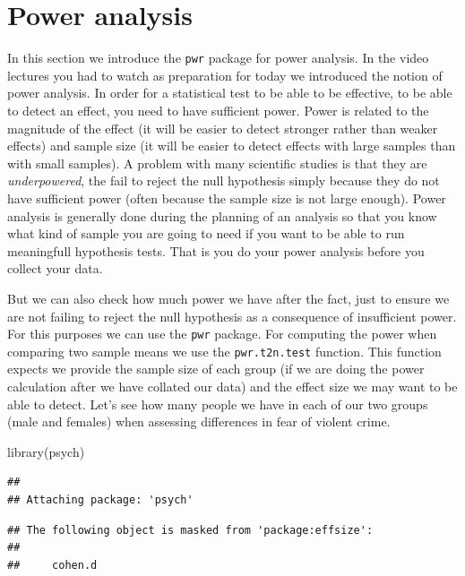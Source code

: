 \documentclass[
]{book}
\newenvironment{Shaded}{\begin{snugshade}}{\end{snugshade}}
\newcommand{\FunctionTok}[1]{\textcolor[rgb]{0.00,0.00,0.00}{#1}}
\newcommand{\NormalTok}[1]{#1}
\begin{document}
\hypertarget{power-analysis}{%
\section{Power analysis}\label{power-analysis}}

In this section we introduce the \texttt{pwr} package for power analysis. In the video lectures you had to watch as preparation for today we introduced the notion of power analysis. In order for a statistical test to be able to be effective, to be able to detect an effect, you need to have sufficient power. Power is related to the magnitude of the effect (it will be easier to detect stronger rather than weaker effects) and sample size (it will be easier to detect effects with large samples than with small samples). A problem with many scientific studies is that they are \emph{underpowered}, the fail to reject the null hypothesis simply because they do not have sufficient power (often because the sample size is not large enough). Power analysis is generally done during the planning of an analysis so that you know what kind of sample you are going to need if you want to be able to run meaningfull hypothesis tests. That is you do your power analysis before you collect your data.

But we can also check how much power we have after the fact, just to ensure we are not failing to reject the null hypothesis as a consequence of insufficient power. For this purposes we can use the \texttt{pwr} package. For computing the power when comparing two sample means we use the \texttt{pwr.t2n.test} function. This function expects we provide the sample size of each group (if we are doing the power calculation after we have collated our data) and the effect size we may want to be able to detect. Let's see how many people we have in each of our two groups (male and females) when assessing differences in fear of violent crime.

\begin{Shaded}
\begin{Highlighting}[]
\FunctionTok{library}\NormalTok{(psych)}
\end{Highlighting}
\end{Shaded}

\begin{verbatim}
## 
## Attaching package: 'psych'
\end{verbatim}

\begin{verbatim}
## The following object is masked from 'package:effsize':
## 
##     cohen.d
\end{verbatim}
\end{document}
